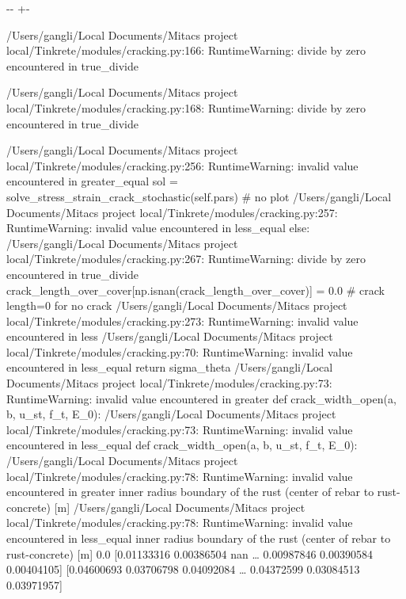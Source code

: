 \documentclass[letterpaper,10pt,english]{sphinxmanual}
\newlength\nbsphinxcodecellspacing
\begin{document}
{

\kern-\sphinxverbatimsmallskipamount\kern-\baselineskip
\kern+\FrameHeightAdjust\kern-\fboxrule
\vspace{\nbsphinxcodecellspacing}

\begin{sphinxVerbatim}[commandchars=\\\{\}]
/Users/gangli/Local Documents/Mitacs project local/Tinkrete/modules/cracking.py:166: RuntimeWarning: divide by zero encountered in true\_divide

/Users/gangli/Local Documents/Mitacs project local/Tinkrete/modules/cracking.py:168: RuntimeWarning: divide by zero encountered in true\_divide

/Users/gangli/Local Documents/Mitacs project local/Tinkrete/modules/cracking.py:256: RuntimeWarning: invalid value encountered in greater\_equal
  sol = solve\_stress\_strain\_crack\_stochastic(self.pars)  \# no plot
/Users/gangli/Local Documents/Mitacs project local/Tinkrete/modules/cracking.py:257: RuntimeWarning: invalid value encountered in less\_equal
  else:
/Users/gangli/Local Documents/Mitacs project local/Tinkrete/modules/cracking.py:267: RuntimeWarning: divide by zero encountered in true\_divide
  crack\_length\_over\_cover[np.isnan(crack\_length\_over\_cover)] = 0.0  \# crack length=0 for no crack
/Users/gangli/Local Documents/Mitacs project local/Tinkrete/modules/cracking.py:273: RuntimeWarning: invalid value encountered in less
/Users/gangli/Local Documents/Mitacs project local/Tinkrete/modules/cracking.py:70: RuntimeWarning: invalid value encountered in less\_equal
  return sigma\_theta
/Users/gangli/Local Documents/Mitacs project local/Tinkrete/modules/cracking.py:73: RuntimeWarning: invalid value encountered in greater
  def crack\_width\_open(a, b, u\_st, f\_t, E\_0):
/Users/gangli/Local Documents/Mitacs project local/Tinkrete/modules/cracking.py:73: RuntimeWarning: invalid value encountered in less\_equal
  def crack\_width\_open(a, b, u\_st, f\_t, E\_0):
/Users/gangli/Local Documents/Mitacs project local/Tinkrete/modules/cracking.py:78: RuntimeWarning: invalid value encountered in greater
  inner radius boundary of the rust (center of rebar to rust-concrete) [m]
/Users/gangli/Local Documents/Mitacs project local/Tinkrete/modules/cracking.py:78: RuntimeWarning: invalid value encountered in less\_equal
  inner radius boundary of the rust (center of rebar to rust-concrete) [m]
0.0
[0.01133316 0.00386504        nan {\ldots} 0.00987846 0.00390584 0.00404105]
[0.04600693 0.03706798 0.04092084 {\ldots} 0.04372599 0.03084513 0.03971957]
\end{sphinxVerbatim}
}
\end{document}
